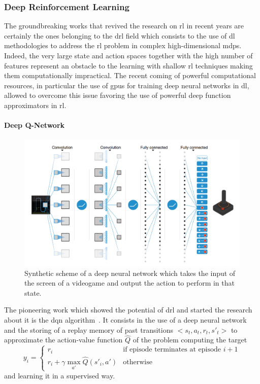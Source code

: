 \subsubsection{Deep Reinforcement Learning}
The groundbreaking works that revived the research on \gls{rl} in recent years are certainly the ones belonging to the \gls{drl} field which consists to the use of \gls{dl} methodologies to address the \gls{rl} problem in complex high-dimensional \glspl{mdp}. Indeed, the very large state and action spaces together with the high number of features represent an obstacle to the learning with shallow \gls{rl} techniques making them computationally impractical. The recent coming of powerful computational resources, in particular the use of \glspl{gpu} for training deep neural networks in \gls{dl}, allowed to overcome this issue favoring the use of powerful deep function approximators in \gls{rl}.

\paragraph{Deep Q-Network}\label{S:dqn}
\begin{figure}[t]
\begin{minipage}{\textwidth}
\begin{center}
  \includegraphics[scale=.15]{img/dqn.png}
\end{center}
\end{minipage}
\caption[DQN network scheme]{Synthetic scheme of a deep neural network which takes the input of the screen of a videogame and output the action to perform in that state.}
\end{figure}
The pioneering work which showed the potential of \gls{drl} and started the research about it is the \gls{dqn} algorithm~\cite{mnih2015human}. It consists in the use of a deep neural network and the storing of a replay memory of past transitions $<s_t, a_t, r_t, s'_t>$ to approximate the action-value function $\hat{Q}$ of the problem computing the target
\begin{equation}\label{E:dqn_update}
y_i=
    \begin{cases}
    r_i & \text{if episode terminates at episode }i+1\\
    r_i + \gamma \max_{a'} \hat{Q}(s'_i, a') & \text{otherwise}
    \end{cases}
\end{equation}
and learning it in a supervised way.

